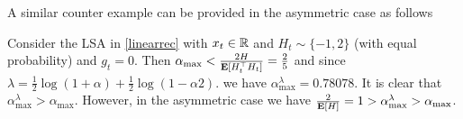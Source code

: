 A similar counter example can be provided in the asymmetric case as follows
\begin{example}
Consider the LSA in \eqref{linearrec} with $x_t\in \mathbb{R}$ and $H_t\sim \{-1, 2\}$ (with equal probability)  and $g_t=0$. Then 
$
\alpha_{\max}<\frac{2H}{\mathbf{E}[H_t^\top H_t]}=\frac{2}{5}
$
and since 
$
\lambda=\frac{1}{2}\log(1+\alpha)+\frac{1}{2}\log(1-\alpha 2).
$
we have $\alpha^{\lambda}_{\max}=0.78078$. It is clear that $\alpha^{\lambda}_{\max}>\alpha_{\max}$. However, in the asymmetric case we have $\frac{2}{\mathbf{E}[H]}=1>\alpha^{\lambda}_{\max}>\alpha_{\max}$.
\end{example}
%

